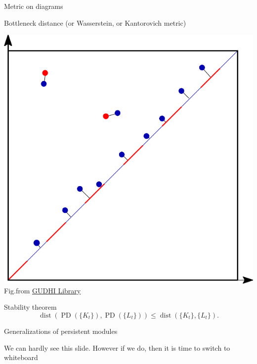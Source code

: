 \documentclass[10pt,xcolor={usenames}]{beamer}
\DeclareMathOperator{\PD}{PD}
\DeclareMathOperator{\dist}{dist}
\begin{document}
\begin{frame}{Metric on diagrams}

Bottleneck distance (or Wasserstein, or Kantorovich metric)

\begin{center}
\includegraphics[scale = 0.4]{pictures/bottleneck.png}\break
Fig.from \href{https://gudhi.inria.fr/doc/latest/group\_\_bottleneck\_\_distance.html}{GUDHI Library}
\end{center}
\pause
\begin{block}{Stability theorem}
\[
\dist(\PD(\{K_t\}),\PD(\{L_t\}))\leqslant \dist(\{K_t\},\{L_t\}).
\]
\end{block}

\end{frame}

\begin{frame}{Generalizations of persistent modules}

We can hardly see this slide. However if we do, then it is time to switch to whiteboard

\end{frame}


\end{document}
